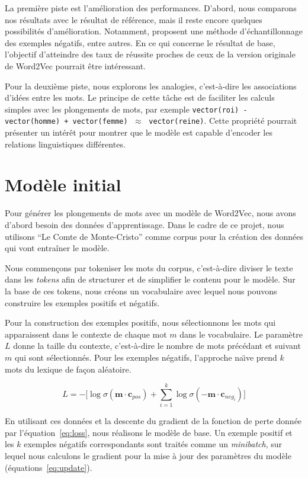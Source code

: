 \documentclass[12pt]{article}
\begin{document}
La première piste est l'amélioration des performances. D'abord, nous comparons nos résultats avec le résultat de référence, mais il reste encore quelques possibilités d'amélioration. Notamment, \cite{DBLP:conf/nips/MikolovSCCD13} proposent une méthode d’échantillonnage des exemples négatifs, entre autres. En ce qui concerne le résultat de base, l'objectif d'atteindre des taux de réussite proches de ceux de la version originale de Word2Vec pourrait être intéressant.

Pour la deuxième piste, nous explorons les analogies, c'est-à-dire les associations d'idées entre les mots. Le principe de cette tâche est de faciliter les calculs simples avec les plongements de mots, par exemple \texttt{vector(roi) - vector(homme) + vector(femme)} $\;\approx\;$ \texttt{vector(reine)}. Cette propriété pourrait présenter un intérêt pour montrer que le modèle est capable d'encoder les relations linguistiques différentes.

\section{Modèle initial} \label{modèle initial}

Pour générer les plongements de mots avec un modèle de Word2Vec, nous avons d'abord besoin des données d'apprentissage. Dans le cadre de ce projet, nous utilisons ``Le Comte de Monte-Cristo'' comme corpus pour la création des données qui vont entraîner le modèle.

Nous commençons par tokeniser les mots du corpus, c'est-à-dire diviser le texte dans les \textit{tokens} afin de structurer et de simplifier le contenu pour le modèle. Sur la base de ces tokens, nous créons un vocabulaire avec lequel nous pouvons construire les exemples positifs et négatifs.

Pour la construction des exemples positifs, nous sélectionnons les mots qui apparaissent dans le contexte de chaque mot $m$ dans le vocabulaire. Le paramètre $L$ donne la taille du contexte, c'est-à-dire le nombre de mots précédant et suivant $m$ qui sont sélectionnés. Pour les exemples négatifs, l'approche na\"\i ve prend $k$ mots du lexique de façon aléatoire. 

\begin{equation}\label{eq:loss}
    L = -\lbrack \log \sigma(\mathbf{m} \cdot \mathbf{c}_{pos}) + \sum_{i=1}^k \log \sigma(-\mathbf{m} \cdot \mathbf{c}_{neg_i}) \rbrack
\end{equation}

En utilisant ces données et la descente du gradient de la fonction de perte donnée par l'équation~\ref{eq:loss}, nous réalisons le modèle de base. Un exemple positif et les $k$ exemples négatifs correspondants sont traités comme un \textit{minibatch}, sur lequel nous calculons le gradient pour la mise à jour des paramètres du modèle (équations~\ref{eq:update}). 
\end{document}
